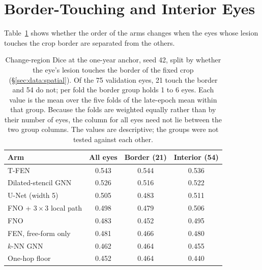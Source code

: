 \section{Border-Touching and Interior Eyes}
\label{app:full-results:border}

Table~\ref{tab:appendix:border-interior} shows whether the order of the
arms changes when the eyes whose lesion touches the crop border are
separated from the others.

\begin{table}[h]
  \centering
  \caption[Change-region Dice on border-touching and interior eyes.]{%
    Change-region Dice at the one-year anchor, seed 42, split by whether the
    eye's lesion touches the border of the fixed crop
    (\S\ref{sec:data:spatial}). Of the 75 validation eyes, 21 touch the
    border and 54 do not; per fold the border group holds 1 to 6 eyes.
    Each value is the mean over the five folds of the late-epoch mean
    within that group. Because the folds are weighted equally rather than
    by their number of eyes, the column for all eyes need not lie between
    the two group columns. The values are descriptive; the groups were not
    tested against each other.}
  \label{tab:appendix:border-interior}
  \small
  \begin{tabular}{l c c c}
    \toprule
    Arm & All eyes & Border (21) & Interior (54) \\
    \midrule
    T-FEN                            & 0.543 & 0.544 & 0.536 \\
    Dilated-stencil GNN              & 0.526 & 0.516 & 0.522 \\
    U-Net (width 5)                  & 0.505 & 0.483 & 0.511 \\
    FNO + $3 \times 3$ local path    & 0.498 & 0.479 & 0.506 \\
    FNO                              & 0.483 & 0.452 & 0.495 \\
    FEN, free-form only              & 0.481 & 0.466 & 0.480 \\
    $k$-NN GNN                       & 0.462 & 0.464 & 0.455 \\
    One-hop floor                    & 0.452 & 0.464 & 0.440 \\
    \bottomrule
  \end{tabular}
\end{table}

